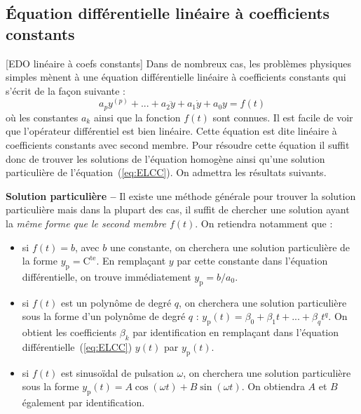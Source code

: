 \subsection{Équation différentielle linéaire à coefficients constants}[EDO linéaire à coefs constants]
Dans de nombreux cas, les problèmes physiques simples mènent à une équation différentielle linéaire à coefficients constants qui s'écrit de la façon suivante :
\begin{equation}
	a_{p}y^{(p)}+...+a_{2}\ddot{y}+a_{1}\dot{y}+a_{0}y=f(t)\label{eq:ELCC}
\end{equation}
où les constantes $a_{k}$ ainsi que la fonction $f(t)$ sont connues. Il est facile de voir que l'opérateur différentiel est bien linéaire. Cette équation est dite linéaire à coefficients constants avec second membre. Pour résoudre cette équation il suffit donc de trouver les solutions de l'équation homogène ainsi qu'une solution particulière de l'équation~(\ref{eq:ELCC}). On admettra les résultats suivants.

\textbf{Solution particulière --} Il existe une méthode générale pour trouver la solution particulière mais dans la plupart des cas, il suffit de chercher une solution ayant la \emph{même forme que le second membre $f(t)$}. On retiendra notamment que :
	\begin{itemize}
		\item si $f(t)=b$, avec $b$ une constante, on cherchera une solution particulière de la forme $y_\text{p}=\mathrm{C^{te}}$. En rempla\c cant $y$ par cette constante dans l'équation différentielle, on trouve immédiatement $y_\text{p}=b/a_{0}$. 
		\item si  $f(t)$ est un polynôme de degré $q$, on cherchera une solution particulière sous la forme d'un polynôme de degré $q$ :  $y_\text{p}(t)=\beta_{0}+\beta_{1}t+...+\beta_{q}t^{q}$. On obtient les coefficients $\beta_{k}$ par identification en rempla\c cant dans l'équation différentielle~(\ref{eq:ELCC}) $y(t)$ par $y_\text{p}(t)$.
		\item si $f(t)$ est sinusoïdal de pulsation $\omega$, on cherchera une solution particulière sous la forme $y_\text{p}(t)=A \cos (\omega t) + B \sin(\omega t)$. On obtiendra $A$ et $B$ également par identification.
	\end{itemize}

